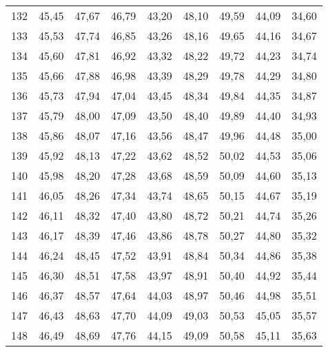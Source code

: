 \begin{longtable}{c c c c c c c c c}
      132	& 45,45	& 47,67	& 46,79	& 43,20	& 48,10	& 49,59	& 44,09	& 34,60 \\
      133	& 45,53	& 47,74	& 46,85	& 43,26	& 48,16	& 49,65	& 44,16	& 34,67 \\
      134	& 45,60	& 47,81	& 46,92	& 43,32	& 48,22	& 49,72	& 44,23	& 34,74 \\
      135	& 45,66	& 47,88	& 46,98	& 43,39	& 48,29	& 49,78	& 44,29	& 34,80 \\
      136	& 45,73	& 47,94	& 47,04	& 43,45	& 48,34	& 49,84	& 44,35	& 34,87 \\
      137	& 45,79	& 48,00	& 47,09	& 43,50	& 48,40	& 49,89	& 44,40	& 34,93 \\
      138	& 45,86	& 48,07	& 47,16	& 43,56	& 48,47	& 49,96	& 44,48	& 35,00 \\
      139	& 45,92	& 48,13	& 47,22	& 43,62	& 48,52	& 50,02	& 44,53	& 35,06 \\
      140	& 45,98	& 48,20	& 47,28	& 43,68	& 48,59	& 50,09	& 44,60	& 35,13 \\
      141	& 46,05	& 48,26	& 47,34	& 43,74	& 48,65	& 50,15	& 44,67	& 35,19 \\
      142	& 46,11	& 48,32	& 47,40	& 43,80	& 48,72	& 50,21	& 44,74	& 35,26 \\
      143	& 46,17	& 48,39	& 47,46	& 43,86	& 48,78	& 50,27	& 44,80	& 35,32 \\
      144	& 46,24	& 48,45	& 47,52	& 43,91	& 48,84	& 50,34	& 44,86	& 35,38 \\
      145	& 46,30	& 48,51	& 47,58	& 43,97	& 48,91	& 50,40	& 44,92	& 35,44 \\
      146	& 46,37	& 48,57	& 47,64	& 44,03	& 48,97	& 50,46	& 44,98	& 35,51 \\
      147	& 46,43	& 48,63	& 47,70	& 44,09	& 49,03	& 50,53	& 45,05	& 35,57 \\
      148	& 46,49	& 48,69	& 47,76	& 44,15	& 49,09	& 50,58	& 45,11	& 35,63 \\
      \bottomrule
    \end{longtable}
